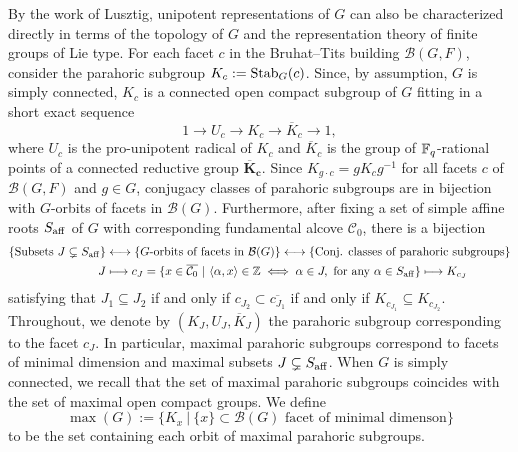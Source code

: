 By the work of Lusztig, unipotent representations of $G$ can also be characterized directly in terms of the topology of $G$ and the representation theory of finite groups of Lie type. For each facet $c$ in the Bruhat--Tits building $\mathcal{B}(G,F)$, consider the parahoric subgroup $K_c:=\mathrm{Stab}_G(c)$. Since, by assumption, $G$ is simply connected, $K_c$ is a connected open compact subgroup of $G$ fitting in a short exact sequence
$$1\longrightarrow U_c\longrightarrow K_c\longrightarrow \overline{K}_c\longrightarrow 1,$$
where $U_c$ is the pro-unipotent radical of $K_c$ and $\overline{K}_c$ is the group of $\mathbb{F}_q$-rational points of a connected reductive group $\mathbf{\overline{K}_c}$. Since $K_{g\cdot c}=gK_cg^{-1}$ for all facets $c$ of $\mathcal{B}(G,F)$ and $g\in G$, conjugacy classes of parahoric subgroups are in bijection with $G$-orbits of facets in $\mathcal{B}(G)$. Furthermore, after fixing a set of simple affine roots $S_{\mathrm{aff}}$ of $G$ with corresponding fundamental alcove $\mathcal{C}_0$, there is a bijection
\begin{align*}
    \{\text{Subsets }J\subsetneq S_{\aff}\}&\longleftrightarrow\{G\text{-orbits of facets in }\mathcal{B}(G)\}\longleftrightarrow\{\text{Conj. classes of parahoric subgroups}\}\\
    J&\longmapsto c_J=\{x\in\overline{\mathcal{C}_0}\ |\ \langle\alpha,x\rangle\in\ZZ\iff\alpha\in J,\text{ for any }\alpha\in S_{\aff}\}\longmapsto K_{c_J}
\end{align*}
satisfying that $J_1\subseteq J_2$ if and only if $c_{J_2}\subset \overline{c_{J_1}}$ if and only if $K_{c_{J_1}}\subseteq K_{c_{J_2}}$. Throughout, we denote by $(K_J,U_J,\overline{K}_J)$ the parahoric subgroup corresponding to the facet $c_J$. In particular, maximal parahoric subgroups correspond to facets of minimal dimension and maximal subsets $J\subsetneq S_{\mathrm{aff}}$. When $G$ is simply connected, we recall that the set of maximal parahoric subgroups coincides with the set of maximal open compact groups. We define $$\max(G):=\{K_x\ |\ \{x\}\subset\mathcal{B}(G)\text{ facet of minimal dimenson}\}$$
to be the set containing each orbit of maximal parahoric subgroups.

